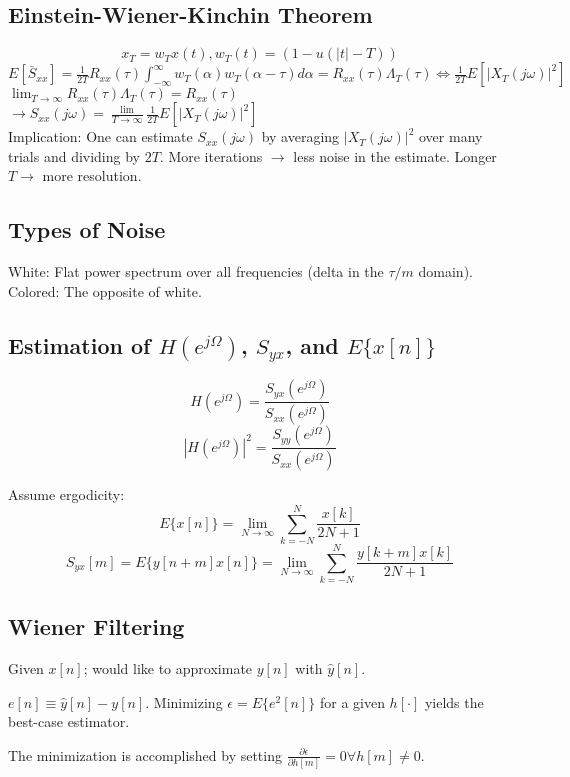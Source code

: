 \documentclass[8pt]{extarticle}
\begin{document}
\begin{multicols*}{3}
\begin{center}
\subsection{Einstein-Wiener-Kinchin Theorem}
\[ x_{T} = w_{T}x(t), w_{T}(t) = (1-u(|t|-T)) \]
\( E[\bar{S}_{xx}] = \frac{1}{2T}R_{xx}(\tau) \int_{-\infty}^{\infty} w_{T}(\alpha) w_{T}(\alpha-\tau) d\alpha = R_{xx}(\tau)\Lambda_{T}(\tau) \Leftrightarrow \frac{1}{2T}E[|X_T(j\omega)|^2]\) \\
\( \lim_{T \rightarrow \infty} R_{xx}(\tau) \Lambda_{T}(\tau) = R_{xx}(\tau) \) \\
\( \rightarrow S_{xx}(j\omega) = \frac{\lim}{T\rightarrow \infty} \frac{1}{2T} E[|X_T(j\omega)|^2] \) \\

Implication: One can estimate \( S_{xx}(j\omega) \) by averaging \( |X_T(j\omega)|^2 \) over many trials and dividing by \( 2T \). More iterations \( \rightarrow \) less noise in the estimate. Longer \( T \rightarrow \) more resolution.

\subsection{Types of Noise}
White: Flat power spectrum over all frequencies (delta in the \( \tau/m \) domain).
Colored: The opposite of white.

\subsection{Estimation of \( H(e^{j\Omega}) \), \( S_{yx} \), and \( E\{x[n]\} \)}
\[ H(e^{j\Omega}) = \frac{S_{yx}(e^{j\Omega})}{S_{xx}(e^{j\Omega})} \]
\[ |H(e^{j\Omega})|^2 = \frac{S_{yy}(e^{j\Omega})}{S_{xx}(e^{j\Omega})} \]

Assume ergodicity:
\[ E\{x[n]\} = \lim_{N \rightarrow \infty} \sum^{N}_{k=-N} \frac{x[k]}{2N+1} \]
\[ S_{yx}[m] = E\{y[n+m]x[n]\} = \lim_{N \rightarrow \infty} \sum^{N}_{k=-N} \frac{y[k+m]x[k]}{2N+1} \]

\subsection{Wiener Filtering}
Given \( x[n] \); would like to approximate \( y[n] \) with \( \hat{y}[n] \).

\( e[n] \equiv \hat{y}[n]-y[n] \). Minimizing \( \epsilon = E\{e^2[n]\} \) for a given \( h[\cdot] \) yields the best-case estimator.

The minimization is accomplished by setting \( \frac{\partial \epsilon}{\partial h[m]} = 0 \forall h[m] \neq 0 \).


\end{center}
\end{multicols*}
\end{document}
